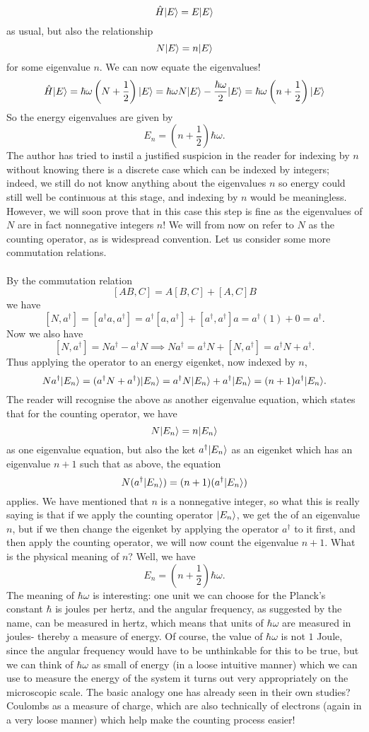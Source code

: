 $$
\hat{H}|E\rangle=E|E\rangle
$$
as usual, but also the relationship
$$
N|E\rangle=n|E\rangle
$$
for some eigenvalue $n$. We can now equate the eigenvalues!
$$
\hat{H}|E\rangle=\hbar\omega\left(N+\frac{1}{2}\right)|E\rangle=\hbar \omega N|E\rangle-\frac{\hbar\omega}{2}|E\rangle=\hbar\omega\left(n+\frac{1}{2}\right)|E\rangle
$$
So the energy eigenvalues are given by 
$$
E_{n}=\left(n+\frac{1}{2}\right)\hbar\omega.
$$
The author has tried to instil a justified suspicion in the reader for indexing by $n$ without knowing there is a discrete case which can be indexed by integers; indeed, we still do not know anything about the eigenvalues $n$ so energy could still well be continuous at this stage, and indexing by $n$ would be meaningless. However, we will soon prove that in this case this step is fine as the eigenvalues of $N$ are in fact nonnegative integers $n$! We will from now on refer to $N$ as the counting operator, as is widespread convention. Let us consider some more commutation relations.
\\\\
By the commutation relation 
$$
[AB,C]=A[B,C]+[A,C]B
$$
we have
$$
[N,a^{\dagger}]=[a^{\dagger}a,a^{\dagger}]=a^{\dagger}[a,a^{\dagger}]+[a^{\dagger},a^{\dagger}]a=a^{\dagger}(1)+0=a^{\dagger}.
$$
Now we also have
$$
[N,a^{\dagger}]=Na^{\dagger}-a^{\dagger}N\implies Na^{\dagger}=a^{\dagger}N+[N,a^{\dagger}]=a^{\dagger}N+a^{\dagger}.
$$
Thus applying the operator to an energy eigenket, now indexed by $n$,
$$
Na^{\dagger}|E_{n}\rangle=(a^{\dagger}N+a^{\dagger})|E_{n}\rangle=a^{\dagger}N|E_{n}\rangle+a^{\dagger}|E_{n}\rangle=(n+1)a^{\dagger}|E_{n}\rangle.
$$
The reader will recognise the above as another eigenvalue equation, which states that for the counting operator, we have 
$$
N|E_{n}\rangle=n|E_{n}\rangle
$$
as one eigenvalue equation, but also the ket $a^{\dagger}|E_{n}\rangle$ as an eigenket which has an eigenvalue $n+1$ such that as above, the equation
$$
N(a^{\dagger}|E_{n}\rangle)=(n+1)(a^{\dagger}|E_{n}\rangle)
$$
applies. We have mentioned that $n$ is a nonnegative integer, so what this is really saying is that if we apply the counting operator $|E_{n}\rangle$, we get the  of an eigenvalue $n$, but if we then change the eigenket by applying the operator $a^{\dagger}$ to it first, and then apply the counting operator, we will now count the eigenvalue $n+1$. What is the physical meaning of $n$? Well, we have 
$$
E_{n}=\left(n+\frac{1}{2}\right)\hbar\omega.
$$
The meaning of $\hbar\omega$ is interesting: one unit we can choose for the Planck's constant $\hbar$ is joules per hertz, and the angular frequency, as suggested by the name, can be measured in hertz, which means that units of $\hbar\omega$ are measured in joules- thereby a measure of energy. Of course, the value of $\hbar\omega$ is not $1$ Joule, since the angular frequency would have to be unthinkable for this to be true, but we can think of $\hbar\omega$ as small  of energy (in a loose intuitive manner) which we can use to measure the energy of the system it turns out very appropriately on the microscopic scale. The basic analogy one has already seen in their own studies? Coulombs as a measure of charge, which are also technically  of electrons (again in a very loose manner) which help make the counting process easier!
